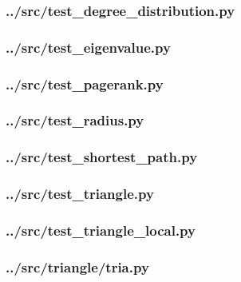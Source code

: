 \subsubsection{../src/test\_degree\_distribution.py}

\subsubsection{../src/test\_eigenvalue.py}

\subsubsection{../src/test\_pagerank.py}

\subsubsection{../src/test\_radius.py}

\subsubsection{../src/test\_shortest\_path.py}

\subsubsection{../src/test\_triangle.py}

\subsubsection{../src/test\_triangle\_local.py}

\subsubsection{../src/triangle/tria.py}

